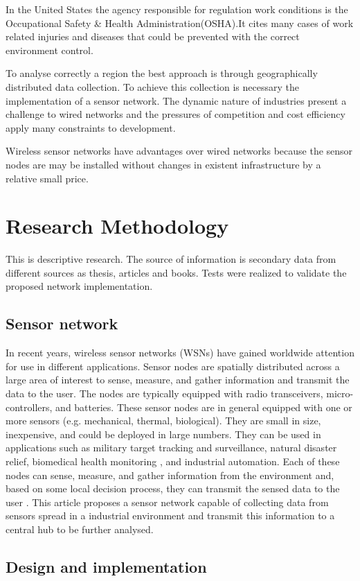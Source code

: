 \documentclass[letterpaper]{IEEEtran}
\begin{document}
In the United States the agency responsible for regulation work conditions is the  Occupational Safety \& Health Administration(OSHA)\cite{OSHA2015}.It cites many cases of work related injuries and diseases that could be prevented with the correct environment control.

To analyse correctly a region the best approach is through geographically distributed data collection. To achieve this collection is necessary the implementation of a sensor network.
The dynamic nature of industries present a challenge to wired networks and the pressures of competition and cost efficiency apply many constraints to development.

Wireless sensor networks have advantages over wired networks because the sensor nodes are may be installed without changes in existent infrastructure by a relative small price\cite{PavithraL2015}.
\section{Research Methodology}
This is descriptive research. The source of information is secondary data from different sources as thesis, articles and books. Tests were realized to validate the proposed network implementation.
\subsection{Sensor network}
In recent years, wireless sensor networks (WSNs) have gained worldwide attention for use in different applications. Sensor nodes are spatially distributed across a large area of interest to sense, measure, and gather information and transmit the data to the user. The nodes are typically equipped with radio transceivers, micro-controllers, and batteries.  These sensor nodes are in general equipped with one or more sensors (e.g. mechanical, thermal, biological)\cite{Ribeiro2010}. They are small in size, inexpensive, and could be deployed in large numbers. They can be used in applications such as military target tracking and surveillance, natural disaster relief, biomedical health monitoring , and industrial automation.\cite{Cheffena2012}
Each of these nodes can sense, measure, and gather information from the environment and, based on some local decision process, they can transmit the sensed data to the user \cite{Ribeiro2010}.
This article proposes a sensor network capable of collecting data from sensors spread in a industrial environment and transmit this information to a central hub to be further analysed.
\subsection{Design and implementation}
\end{document}
